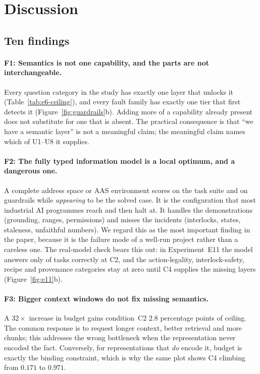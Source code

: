 \section{Discussion}
\label{sec:discussion}

\subsection{Ten findings}
\paragraph{F1: Semantics is not one capability, and the parts are not
interchangeable.} Every question category in the study has exactly one layer that
unlocks it (Table~\ref{tab:e6-ceiling}), and every fault family has exactly
one tier that first detects it (Figure~\ref{fig:guardrails}b). Adding more of a
capability already present does not substitute for one that is absent. The
practical consequence is that ``we have a semantic layer'' is not a meaningful
claim; the meaningful claim names which of U1--U8 it supplies.

\paragraph{F2: The fully typed information model is a local optimum, and a
dangerous one.} A complete \opcua{} address space or AAS environment scores
\CeilingCTwo{} on the task suite and \RecallGTwo{} on guardrails while
\emph{appearing} to be the solved case. It is the configuration that most
industrial AI programmes reach and then halt at. It handles the demonstrations
(grounding, ranges, permissions) and misses the incidents (interlocks, states,
staleness, unfaithful numbers). We regard this as the most important finding in
the paper, because it is the failure mode of a well-run project rather than a
careless one. The real-model check bears this out: in Experiment~E11 the model
answers only \EllAccCTwo{} of tasks correctly at C2, and the action-legality,
interlock-safety, recipe and provenance categories stay at zero until C4 supplies
the missing layers (Figure~\ref{fig:e11}b).

\paragraph{F3: Bigger context windows do not fix missing semantics.}
A $32\times$ increase in budget gains condition~C2 $2.8$ percentage points of
ceiling. The common response is to request longer context, better retrieval and
more chunks; this addresses the wrong bottleneck when the representation never
encoded the fact. Conversely, for representations that \emph{do} encode it,
budget is exactly the binding constraint, which is why the same plot shows C4
climbing from $0.171$ to $0.971$.

